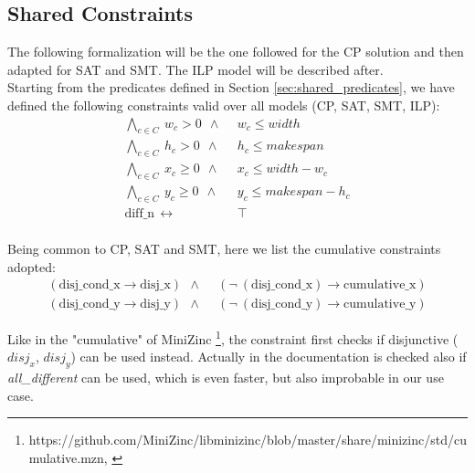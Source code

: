 

\subsection{Shared Constraints} \label{sec:shared_constraints}
    The following formalization will be the one followed for the CP solution and then adapted for
    SAT and SMT. The ILP model will be described after. \\

    Starting from the predicates defined in Section \ref{sec:shared_predicates}, we have defined 
    the following constraints valid over all models (CP, SAT, SMT, ILP):
    \begin{align*}
        \bigwedge_{c \in C}\ w_c > 0\ \    \land\                   &\ w_c \leq width \\
        \bigwedge_{c \in C}\ h_c > 0\ \   \land\                    &\ h_c \leq makespan \\
        \bigwedge_{c \in C}\ x_c \geq 0\ \ \land\                   &\ x_c \leq width - w_c \\
        \bigwedge_{c \in C}\ y_c \geq 0\ \ \land\                   &\ y_c \leq makespan - h_c \\
        \text{diff\_n}\ \ \leftrightarrow\ &\ \top \\
    \end{align*}
    
    Being common to CP, SAT and SMT, here we list the cumulative constraints adopted:
    \begin{align*}
        (\text{disj\_cond\_x} \rightarrow \text{disj\_x})\ \ \land\ &\ (\neg\ (\text{disj\_cond\_x}) \rightarrow \text{cumulative\_x}) \\
        (\text{disj\_cond\_y} \rightarrow \text{disj\_y})\ \ \land\ &\ (\neg\ (\text{disj\_cond\_y}) \rightarrow \text{cumulative\_y})
    \end{align*}

    Like in the "cumulative" of MiniZinc \footnote[1]{https://github.com/MiniZinc/libminizinc/blob/master/share/minizinc/std/cumulative.mzn, \label{fn:minizinc_cumulative}}, 
    the constraint first checks if disjunctive ($disj_x$, $disj_y$) can be used instead. 
    Actually in the documentation 
    is checked also if \textit{all\_different} can be used, which is even faster, but also improbable in our use case. 

